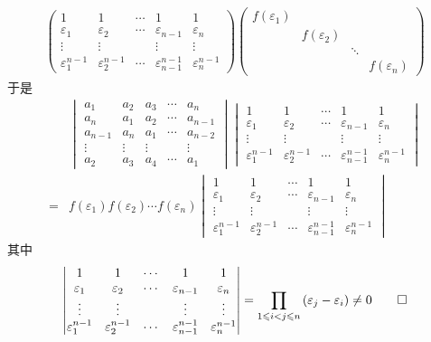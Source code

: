 \begin{Proof}
\begin{align*}
\begin{pmatrix}
		1&1&\cdots&1&1\\
	\varepsilon_1&\varepsilon_2&\cdots&\varepsilon_{n-1}&\varepsilon_n\\
	\vdots&\vdots&&\vdots&\vdots\\
	\varepsilon_1^{n-1}&\varepsilon_2^{n-1}&\cdots&\varepsilon_{n-1}^{n-1}&\varepsilon_n^{n-1}
	\end{pmatrix}\begin{pmatrix}
		f\left(\varepsilon_1\right)&&&\\
		&f\left(\varepsilon_2\right)&&\\
		&&\ddots&\\
		&&& f\left(\varepsilon_n\right)
	\end{pmatrix}
\end{align*}
于是
\begin{align*}
	&\begin{vmatrix}
		a_1&a_2&a_3&\cdots&a_n\\
    a_n&a_1&a_2&\cdots&a_{n-1}\\
    a_{n-1}&a_n&a_1&\cdots&a_{n-2}\\
    \vdots&\vdots&\vdots&&\vdots\\
    a_2&a_3&a_4&\cdots&a_{1}
	\end{vmatrix}
	\begin{vmatrix}
		1&1&\cdots&1&1\\
	\varepsilon_1&\varepsilon_2&\cdots&\varepsilon_{n-1}&\varepsilon_n\\
	\vdots&\vdots&&\vdots&\vdots\\
	\varepsilon_1^{n-1}&\varepsilon_2^{n-1}&\cdots&\varepsilon_{n-1}^{n-1}&\varepsilon_n^{n-1}
	\end{vmatrix}\\
	=&f\left(\varepsilon_1\right)f\left(\varepsilon_2\right)\cdots f\left(\varepsilon_n\right)
	\begin{vmatrix}
		1&1&\cdots&1&1\\
	\varepsilon_1&\varepsilon_2&\cdots&\varepsilon_{n-1}&\varepsilon_n\\
	\vdots&\vdots&&\vdots&\vdots\\
	\varepsilon_1^{n-1}&\varepsilon_2^{n-1}&\cdots&\varepsilon_{n-1}^{n-1}&\varepsilon_n^{n-1}
	\end{vmatrix}
\end{align*}
其中
\[
\begin{vmatrix}
		1&1&\cdots&1&1\\
	\varepsilon_1&\varepsilon_2&\cdots&\varepsilon_{n-1}&\varepsilon_n\\
	\vdots&\vdots&&\vdots&\vdots\\
	\varepsilon_1^{n-1}&\varepsilon_2^{n-1}&\cdots&\varepsilon_{n-1}^{n-1}&\varepsilon_n^{n-1}
	\end{vmatrix}=\prod_{1\leqslant i<j\leqslant n}\left(\varepsilon_j-\varepsilon_i\right)\neq 
	0\qedhere
\]
\end{Proof}

